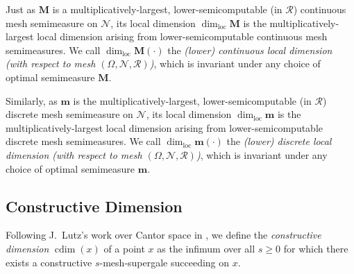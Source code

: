 Just as $\mathbf{M}$ is a multiplicatively-largest, lower-semicomputable (in $\mathscr{R}$) continuous mesh semimeasure on $\mathcal{N}$, its local dimension $\dim_{\operatorname{loc}} \mathbf{M}$ is the multiplicatively-largest local dimension arising from lower-semicomputable continuous mesh semimeasures. We call $\dim_{\operatorname{loc}}\mathbf{M}(\cdot)$ the \textit{(lower) continuous local dimension (with respect to mesh $(\Omega, \mathcal{N}, \mathscr{R})$)}, which is invariant under any choice of optimal semimeasure $\mathbf{M}$. 

Similarly, as $\mathbf{m}$ is the multiplicatively-largest, lower-semicomputable (in $\mathscr{R}$) discrete mesh semimeasure on $\mathcal{N}$, its local dimension $\dim_{\operatorname{loc}} \mathbf{m}$ is the multiplicatively-largest local dimension arising from lower-semicomputable discrete mesh semimeasures. We call $\dim_{\operatorname{loc}}\mathbf{m}(\cdot)$ the \textit{(lower) discrete local dimension (with respect to mesh $(\Omega, \mathcal{N}, \mathscr{R})$)}, which is invariant under any choice of optimal semimeasure $\mathbf{m}$. 

\subsection{Constructive Dimension}

Following J.~Lutz's work over Cantor space in \cite{Lut00}, we define the \textit{constructive dimension} $\operatorname{cdim}(x)$ of a point $x$ as the infimum over all $s \geq 0$ for which there exists a constructive $s$-mesh-supergale succeeding on $x$.

